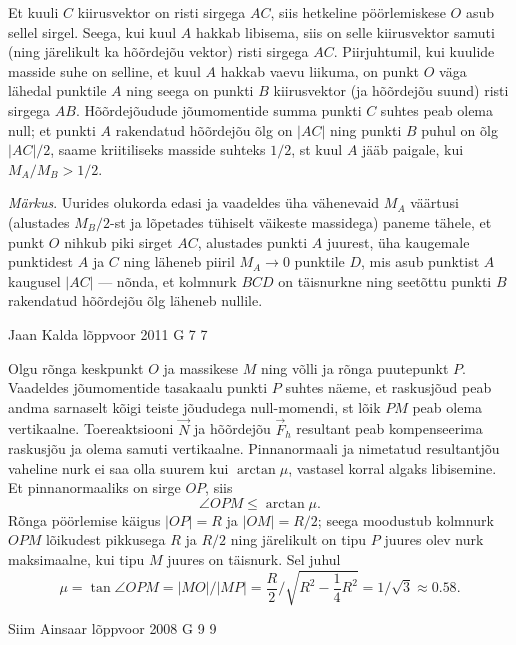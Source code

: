 \documentclass[11pt]{article}
\begin{document}
{{\ifSolution
Et kuuli $C$ kiirusvektor on risti sirgega $AC$, siis hetkeline pöörlemiskese $O$ asub sellel sirgel. Seega, kui kuul $A$ hakkab libisema, siis on selle kiirusvektor samuti (ning järelikult ka hõõrdejõu vektor) risti sirgega $AC$. Piirjuhtumil, kui kuulide masside suhe on selline, et kuul $A$ hakkab vaevu liikuma, on punkt $O$ väga lähedal punktile $A$ ning seega on punkti $B$ kiirusvektor (ja hõõrdejõu suund) risti sirgega $AB$. Hõõrdejõudude jõumomentide summa punkti $C$ suhtes peab olema null; et punkti $A$ rakendatud hõõrdejõu õlg on $|AC|$ ning punkti $B$ puhul on õlg $|AC|/2$, saame kriitiliseks masside suhteks $1/2$, st kuul $A$ jääb paigale, kui $M_A/M_B > 1/2$.

\emph{Märkus}. Uurides olukorda edasi ja vaadeldes üha vähenevaid $M_A$ väärtusi (alustades $M_B/2$-st ja lõpetades tühiselt väikeste massidega) paneme tähele, et punkt $O$ nihkub piki sirget $AC$, alustades punkti $A$ juurest, üha kaugemale punktidest $A$ ja $C$ ning läheneb piiril $M_A \rightarrow 0$ punktile $D$, mis asub punktist $A$ kaugusel $|AC|$ --- nõnda, et kolmnurk $BCD$ on täisnurkne ning seetõttu punkti $B$ rakendatud hõõrdejõu õlg läheneb nullile.
\fi
}

{Jaan Kalda} %
{lõppvoor} %
{2011} %
{G 7} %
{7} %
{

\ifSolution
Olgu rõnga keskpunkt $O$ ja massikese $M$ ning võlli ja rõnga puutepunkt $P$. Vaadeldes jõumomentide tasakaalu punkti $P$ suhtes näeme, et raskusjõud peab andma
sarnaselt kõigi teiste jõududega null-momendi, st lõik $PM$ peab olema vertikaalne.
Toereaktsiooni $\vec N$ ja hõõrdejõu $\vec F_h$ resultant peab kompenseerima raskusjõu ja olema samuti vertikaalne. Pinnanormaali ja nimetatud resultantjõu vaheline nurk ei
saa olla suurem kui $\arctan\mu$, vastasel korral algaks libisemine. Et pinnanormaaliks on sirge $OP$, siis
\[
\angle O P M \leq \arctan \mu.
\]
Rõnga pöörlemise käigus $|OP| = R$ ja $|OM| = R/2$; seega moodustub kolmnurk
$OPM$ lõikudest pikkusega $R$ ja $R/2$ ning järelikult on tipu $P$ juures olev nurk
maksimaalne, kui tipu $M$ juures on täisnurk. Sel juhul
\[
\mu=\tan \angle O P M=|M O| /|M P|=\frac{R}{2} / \sqrt{R^{2}-\frac{1}{4} R^{2}}=1 / \sqrt{3} \approx \num{0,58}.
\]
\fi
}

{Siim Ainsaar} %
{lõppvoor} %
{2008} %
{G 9} %
{9} %
{

}}
\end{document}
